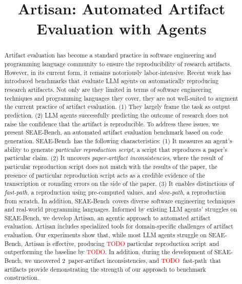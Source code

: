 \documentclass[acmsmall,screen,review,anonymous]{acmart}
\begin{document}
\newcommand\benchmark{SEAE-Bench}
\newcommand\approach{Artisan}

\newcommand\particularscrip{particular reproduction script}
\newcommand\newbug{paper-artifact inconsistencies}
\newcommand\fastpath{fast-path}
\newcommand\slowpath{slow-path}

\newcommand\papersetsize{28}
\newcommand\tablesetsize{101}
\newcommand\particularscriptsize{\textcolor{red}{TODO}}
\newcommand\particularscriptsizeoutperform{\textcolor{red}{TODO}}
\newcommand\inconsistenciessize{2}
\newcommand\fastpathsize{\textcolor{red}{TODO}}

\newcommand\todo[1]{\textcolor{red}{TODO: #1}}

\title{Artisan: Automated Artifact Evaluation with Agents}
\begin{abstract}
Artifact evaluation has become a standard practice in software engineering and programming language community to ensure the reproducibility of research artifacts.
However, in its current form, it remains notoriously labor-intensive.
Recent work has introduced benchmarks that evaluate LLM agents on automatically reproducing research artifaccts.
Not only are they limited in terms of software engineering techniques and programming languages they cover, they are not well-suited to augment the current practice of artifact evaluation.
(1) They largely frame the task as output prediction.
(2) LLM agents successfully predicting the outcome of research does not raise the confidence that the artifact is reproducible.
To address these issues, we present \benchmark, an automated artifact evaluation benchmark based on code generation.
\benchmark~has the following characteristics:
(1) It measures an agent’s ability to generate \emph{\particularscrip{}}, a script that reproduces a paper’s particular claim.
(2) It uncovers \emph{\newbug{}}, where the result of \particularscrip{} does not match with the results of the paper, the presence of \particularscrip{} acts as a credible evidence of the transcription or rounding errors on the side of the paper.
(3) It enables distinctions of \emph{\fastpath{}}, a reproduction using pre-computed values, and \emph{\slowpath{}}, a reproduction from scratch.
In addition, \benchmark~covers diverse software engineering techniques and real-world programming languages.
Informed by existing LLM agents’ struggles on \benchmark, we develop Artisan, an agentic approach to automated artifact evaluation.
Artisan includes specialized tools for domain-specific challenges of artifact evaluation.
Our experiments show that, while most LLM agents struggle on \benchmark, Artisan is effective, producing \particularscriptsize{} \particularscrip{}~and outperforming the baseline by \particularscriptsizeoutperform{}.
In addition, during the development of \benchmark, we uncovered \inconsistenciessize~\newbug{}, and \fastpathsize~\fastpath{}~that artifacts provide demonstrating the strength of our approach to benchmark construction.
\end{abstract}
\maketitle










\end{document}
